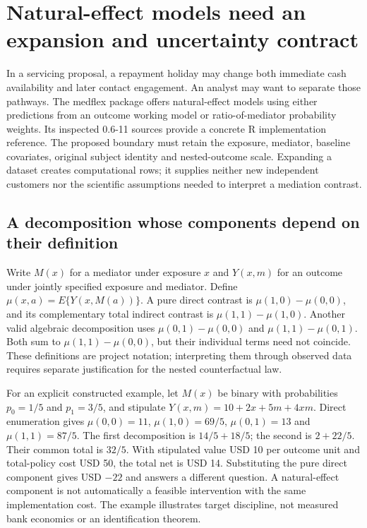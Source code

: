 \section{Natural-effect models need an expansion and uncertainty contract}
\label{exec23:medflex-scope}
In a servicing proposal, a repayment holiday may change both immediate cash
availability and later contact engagement. An analyst may want to separate
those pathways. The medflex package offers natural-effect models using either
predictions from an outcome working model or ratio-of-mediator probability
weights. Its inspected 0.6-11 sources provide a concrete R implementation
reference. The proposed boundary must retain the exposure, mediator, baseline
covariates, original subject identity and nested-outcome scale. Expanding a
dataset creates computational rows; it supplies neither new independent
customers nor the scientific assumptions needed to interpret a mediation
contrast.
\citep{exec23_medflex_sources}

\subsection{A decomposition whose components depend on their definition}
\label{exec23:medflex-target}
Write $M(x)$ for a mediator under exposure $x$ and $Y(x,m)$ for an outcome
under jointly specified exposure and mediator. Define
$\mu(x,a)=E\{Y(x,M(a))\}$. A pure direct contrast is
$\mu(1,0)-\mu(0,0)$, and its complementary total indirect contrast is
$\mu(1,1)-\mu(1,0)$. Another valid algebraic decomposition uses
$\mu(0,1)-\mu(0,0)$ and $\mu(1,1)-\mu(0,1)$. Both sum to
$\mu(1,1)-\mu(0,0)$, but their individual terms need not coincide.
These definitions are project notation; interpreting them through observed
data requires separate justification for the nested counterfactual law.

For an explicit constructed example, let $M(x)$ be binary with probabilities
$p_0=1/5$ and $p_1=3/5$, and stipulate
$Y(x,m)=10+2x+5m+4xm$. Direct enumeration gives
$\mu(0,0)=11$, $\mu(1,0)=69/5$, $\mu(0,1)=13$ and
$\mu(1,1)=87/5$. The first decomposition is $14/5+18/5$;
the second is $2+22/5$. Their common total is $32/5$. With
stipulated value USD 10 per outcome unit and total-policy cost USD 50,
the total net is USD 14. Substituting the pure direct component gives
USD $-22$ and answers a different question. A natural-effect component
is not automatically a feasible intervention with the same implementation
cost. The example illustrates target discipline, not measured bank economics
or an identification theorem.
\citep{exec23_medflex_reference}

